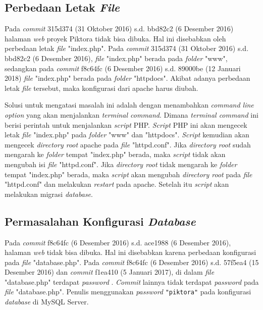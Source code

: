 \subsection{Perbedaan Letak \textit{File}}
\label{subsec:perbedaan_letak_file}
Pada \textit{commit} 315d374 (31 Oktober 2016) s.d. bbd82c2 (6 Desember 2016) halaman \textit{web} proyek Piktora tidak bisa dibuka. Hal ini disebabkan oleh perbedaan letak \textit{file} "index.php". Pada \textit{commit} 315d374 (31 Oktober 2016) s.d. bbd82c2 (6 Desember 2016), \textit{file} "index.php" berada pada \textit{folder} "www", sedangkan pada \textit{commit} f8c64fc (6 Desember 2016) s.d. 89000be (12 Januari 2018) \textit{file} "index.php" berada pada \textit{folder} "httpdocs". Akibat adanya perbedaan letak \textit{file} tersebut, maka konfigurasi dari apache harus diubah.


Solusi untuk mengatasi masalah ini adalah dengan menambahkan \textit{command line option} yang akan menjalankan \textit{terminal command}. Dimana \textit{terminal command} ini berisi perintah untuk menjalankan \textit{script} PHP. \textit{Script} PHP ini akan mengecek letak \textit{file} "index.php" pada \textit{folder} "www" dan "httpdocs". \textit{Script} kemudian akan mengecek \textit{directory root} apache pada \textit{file} "httpd.conf".  Jika \textit{directory root} sudah mengarah ke \textit{folder} tempat "index.php" berada, maka \textit{script} tidak akan mengubah isi \textit{file} "httpd.conf". Jika \textit{directory root} tidak mengarah ke \textit{folder} tempat "index.php" berada, maka \textit{script} akan mengubah \textit{directory root} pada \textit{file} "httpd.conf" dan melakukan \textit{restart} pada apache. Setelah itu \textit{script} akan melakukan migrasi \textit{database}.   


\subsection{Permasalahan Konfigurasi \textit{Database}}
\label{subsec:konfigurasi_database}
Pada \textit{commit} f8c64fc (6 Desember 2016) s.d. ace1988 (6 Desember 2016), halaman \textit{web} tidak bisa dibuka. Hal ini disebabkan karena perbedaan konfigurasi pada \textit{file} "database.php". Pada \textit{commit} f8c64fc (6 Desember 2016) s.d. 57f5ea4 (15 Desember 2016) dan \textit{commit} f1ea410 (5 Januari 2017), di dalam \textit{file} "database.php" terdapat \textit{password} . \textit{Commit} lainnya tidak terdapat \textit{password} pada \textit{file} "database.php". Penulis menggunakan \textit{password} \texttt{"piktora"} pada konfigurasi \textit{database} di MySQL Server.

